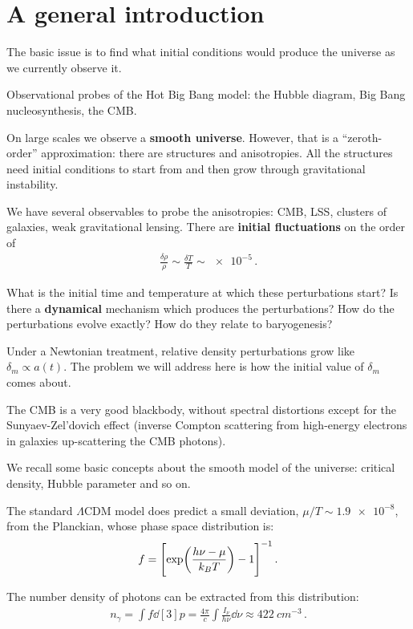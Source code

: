 \documentclass[main.tex]{subfiles}
\begin{document}
\section{A general introduction}

The basic issue is to find what initial conditions would produce the universe as we currently observe it.

Observational probes of the Hot Big Bang model: the Hubble diagram, Big Bang nucleosynthesis, the CMB. 

On large scales we observe a \textbf{smooth universe}. However, that is a ``zeroth-order'' approximation: there are structures and anisotropies. 
All the structures need initial conditions to start from and then grow through gravitational instability. 

We have several observables to probe the anisotropies: CMB, LSS, clusters of galaxies, weak gravitational lensing. 
There are \textbf{initial fluctuations} on the order of 
%
\begin{align}
\frac{ \delta \rho }{\rho } \sim \frac{ \delta T}{T} \sim \num{e-5}
\,.
\end{align}

What is the initial time and temperature at which these perturbations start? Is there a \textbf{dynamical} mechanism which produces the perturbations? 
How do the perturbations evolve exactly? 
How do they relate to baryogenesis?

Under a Newtonian treatment, relative density perturbations grow like \(\delta _m \propto a(t)\). 
The problem we will address here is how the initial value of \(\delta _m\) comes about. 

The CMB is a very good blackbody, without spectral distortions except for the Sunyaev-Zel'dovich effect (inverse Compton scattering from high-energy electrons in galaxies up-scattering the CMB photons). 

We recall some basic concepts about the smooth model of the universe: critical density, Hubble parameter and so on. 

The standard \(\Lambda \)CDM model does predict a small deviation, \(\mu / T \sim \num{1.9e-8}\), from the Planckian, whose phase space distribution is: 
%
\begin{align}
f = \qty[\exp(\frac{h \nu - \mu }{k_B T}) - 1]^{-1}
\,.
\end{align}

The number density of photons can be extracted from this distribution: 
%
\begin{align}
n_\gamma = \int f \dd[3]{p} = \frac{4 \pi }{c} \int \frac{I_\nu}{h \nu } \dd{\nu } \approx \SI{422}{cm^{-3}}
\,.
\end{align}
%
\end{document}

